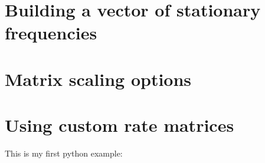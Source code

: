 \documentclass{article}
\newcommand\pythonexternal[2][]{{
		}}
\begin{document}
\section{Building a vector of stationary frequencies}\label{sec:freqs}
\section{Matrix scaling options}\label{sec:scaling}
\section{Using custom rate matrices}\label{sec:custom}

\noindent This is my first python example:

\pythonexternal{script.py}














\end{document}
